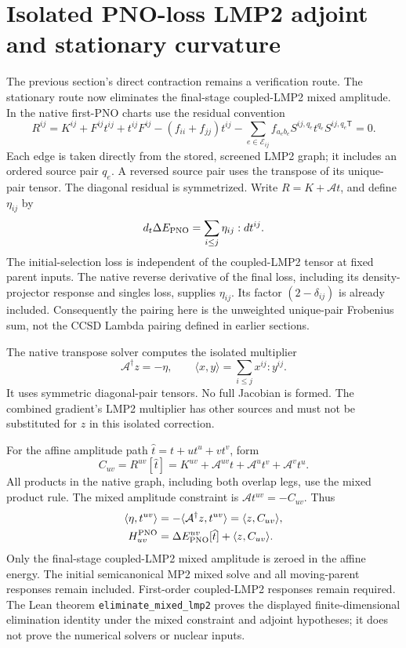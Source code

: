 \documentclass[11pt]{article}
\begin{document}
\section{Isolated PNO-loss LMP2 adjoint and stationary curvature}
The previous section's direct contraction remains a verification route.
The stationary route now eliminates the final-stage coupled-LMP2 mixed
amplitude. In the native first-PNO charts use the residual convention
\begin{equation}
 R^{ij}=K^{ij}+F^{ij}t^{ij}+t^{ij}F^{ij}
 -(f_{ii}+f_{jj})t^{ij}
 -\sum_{e\in\mathcal E_{ij}} f_{a_e b_e}
       S^{ij,q_e}t^{q_e}S^{ij,q_e\mathsf T}=0.
\end{equation}
Each edge is taken directly from the stored, screened LMP2 graph; it includes
an ordered source pair $q_e$. A reversed source pair uses the transpose
of its unique-pair tensor. The diagonal residual is symmetrized.
Write $R=K+\mathcal A t$, and define $\eta_{ij}$ by
\begin{equation}
 d_t\Delta E_{\rm PNO}=\sum_{i\leq j}\eta_{ij}:dt^{ij}.
\end{equation}
The initial-selection loss is independent of the coupled-LMP2 tensor
at fixed parent inputs. The native reverse derivative of the final loss,
including its density-projector response and singles loss, supplies
$\eta_{ij}$. Its factor $(2-\delta_{ij})$ is already included.
Consequently the pairing here is the unweighted unique-pair Frobenius sum,
not the CCSD Lambda pairing defined in earlier sections.

The native transpose solver computes the isolated multiplier
\begin{equation}
 \mathcal A^\dagger z=-\eta,\qquad
 \langle x,y\rangle=\sum_{i\leq j}x^{ij}:y^{ij}.
\end{equation}
It uses symmetric diagonal-pair tensors. No full Jacobian is formed.
The combined gradient's LMP2 multiplier has other sources and must not
be substituted for $z$ in this isolated correction.

For the affine amplitude path
$\widehat t=t+u t^u+v t^v$, form
\begin{equation}
 C_{uv}=R^{uv}[\widehat t]
       =K^{uv}+\mathcal A^{uv}t+\mathcal A^u t^v+\mathcal A^v t^u.
\end{equation}
All products in the native graph, including both overlap legs, use the
mixed product rule. The mixed amplitude constraint is
$\mathcal A t^{uv}=-C_{uv}$. Thus
\begin{align}
 \langle\eta,t^{uv}\rangle
 &=-\langle\mathcal A^\dagger z,t^{uv}\rangle
   =\langle z,C_{uv}\rangle,\\
 H^{\rm PNO}_{uv}
 &=\Delta E^{uv}_{\rm PNO}[\widehat t]+\langle z,C_{uv}\rangle.
\end{align}
Only the final-stage coupled-LMP2 mixed amplitude is zeroed in the affine
energy. The initial semicanonical MP2 mixed solve and all moving-parent
responses remain included. First-order coupled-LMP2 responses remain required.
The Lean theorem \texttt{eliminate\_mixed\_lmp2} proves the displayed
finite-dimensional elimination identity under the mixed constraint and
adjoint hypotheses; it does not prove the numerical solvers or nuclear inputs.
\end{document}
